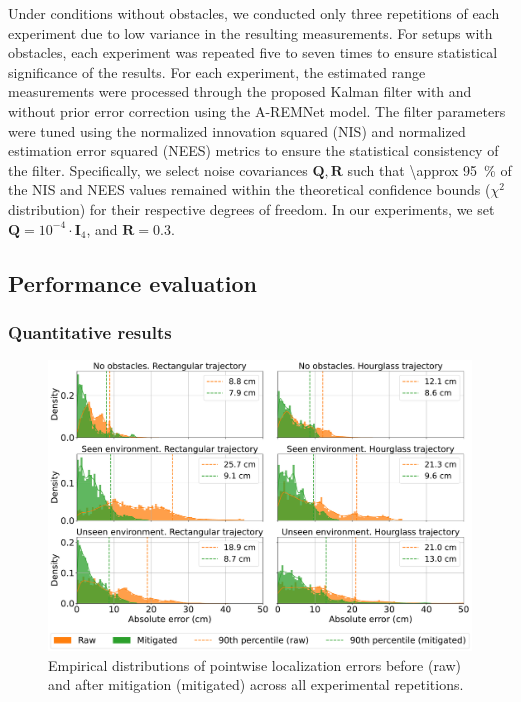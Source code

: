 Under conditions without obstacles, we conducted only three repetitions of each experiment due to low variance in the resulting measurements. For setups with obstacles, each experiment was repeated five to seven times to ensure statistical significance of the results. For each experiment, the estimated range measurements were processed through the proposed Kalman filter with and without prior error correction using the A-REMNet model. The filter parameters were tuned using the normalized innovation squared (NIS) and normalized estimation error squared (NEES) metrics to ensure the statistical consistency of the filter. Specifically, we select noise covariances $\mathbf{Q}, \mathbf{R}$ such that \SI{\approx 95}{\percent} of the NIS and NEES values remained within the theoretical confidence bounds ($\chi^2$ distribution) for their respective degrees of freedom. In our experiments, we set $\mathbf{Q} = 10^{-4} \cdot \mathbf{I}_4$, and $\mathbf{R} = 0.3$.

\subsection{Performance evaluation}
\subsubsection{Quantitative results}

\begin{figure}[tbh]
    \centering
    \includegraphics[width=\textwidth]{Figures/experiments_and_results/dtw_errors.pdf}
    \caption[Empirical distributions of localization errors before and after mitigation.]{Empirical distributions of pointwise localization errors before (raw) and after mitigation (mitigated) across all experimental repetitions.}
    \label{fig:dtw_errors}
\end{figure}

